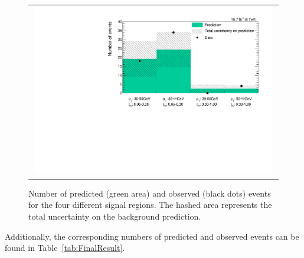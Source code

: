 \begin{figure}[!b]
  \centering 
  \begin{tabular}{c}
    \includegraphics[width=0.98\textwidth]{figures/analysis/Results/FinalResultPlot.pdf} 
  \end{tabular}
  \caption{Number of predicted (green area) and observed (black dots) events for the four different signal regions. The hashed area represents the total uncertainty on the background prediction.}
  \label{fig:FinalResult}
\end{figure} 
Additionally, the corresponding numbers of predicted and observed events can be found in Table~\ref{tab:FinalResult}.


